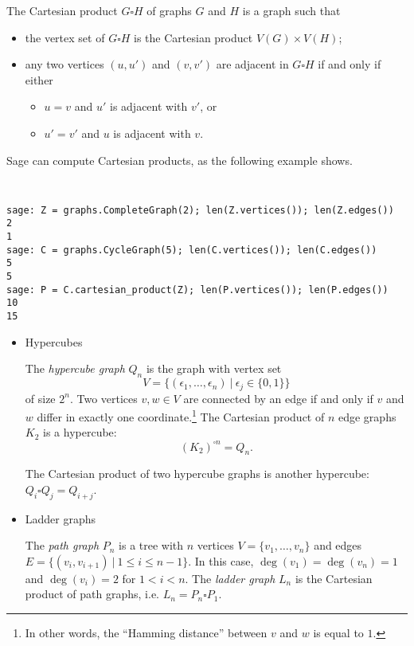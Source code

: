 The Cartesian product $G \square H$ of graphs $G$ and $H$ is a graph such that
%
\begin{itemize}
\item the vertex set of $G \square H$ is the Cartesian product
  $V(G) \times V(H)$;

\item any two vertices $(u, u')$ and $(v, v')$ are adjacent in
  $G \square H$ if and only if either
  \begin{itemize}
  \item $ u = v$ and $u'$ is adjacent with $v'$, or

  \item $u' = v'$ and $u$ is adjacent with $v$.
  \end{itemize}
\end{itemize}
%
Sage can compute Cartesian products, as the following example shows.
%
\begin{center}
\fontsize{9pt}{9pt}
\selectfont
\tt
\begin{lstlisting}
sage: Z = graphs.CompleteGraph(2); len(Z.vertices()); len(Z.edges())
2
1
sage: C = graphs.CycleGraph(5); len(C.vertices()); len(C.edges())
5
5
sage: P = C.cartesian_product(Z); len(P.vertices()); len(P.edges())
10
15
\end{lstlisting}
\end{center}

\begin{itemize}
\item Hypercubes

The \emph{hypercube graph} $Q_n$ is the graph with vertex set
\[
V
=
\big\{ (\epsilon_1,\dots,\epsilon_n)\ |\ \epsilon_j \in \{0,1\} \big\}
\]
of size $2^n$. Two vertices $v,w \in V$ are connected by an edge if
and only if $v$ and $w$ differ in exactly one
coordinate.\footnote{
In other words, the ``Hamming distance'' between $v$ and $w$ is equal
to $1$.}
The Cartesian product of $n$ edge graphs $K_2$ is a hypercube:
\[
(K_2)^{\square n} = Q_n.
\]

\begin{example}
The Cartesian product of two hypercube graphs is another
hypercube: $Q_i \square Q_j = Q_{i+j}$.
\end{example}


\item Ladder graphs

The \emph{path graph} $P_n$ is a tree with $n$ vertices
$V = \{ v_1,\dots, v_n \}$ and edges
$E = \{ (v_i, v_{i+1})\ |\ 1 \leq i \leq n-1 \}$. In this case,
$\deg(v_1) = \deg(v_n) = 1$ and $\deg(v_i) = 2$ for $1 < i < n$.
The \emph{ladder graph} $L_n$ is the Cartesian product of path
graphs, i.e. $L_n = P_n \square P_1$.
\end{itemize}

